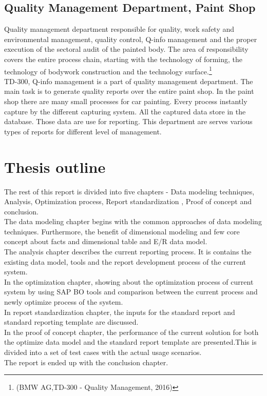 \subsection{Quality Management Department, Paint Shop}

Quality management department  responsible for quality, work safety and environmental management, quality control, Q-info management and the proper execution of the sectoral audit of the painted body. The area of responsibility covers the entire process chain, starting with the technology of forming, the technology of bodywork construction and the technology surface.\footnote{(BMW AG,TD-300 - Quality Management, 2016)}\\

TD-300, Q-info management is a part of quality management department. The main task is to generate quality reports over the entire paint shop. In the paint shop there are many small  processes for car painting. Every process instantly capture by the different capturing system. All the captured data store in the database. Those data are use for reporting. This department are serves various types of reports for different level of management.\newpage   
\section{Thesis outline}
The rest of this report is divided into five chapters - Data modeling techniques, Analysis, Optimization process, Report standardization , Proof of concept and conclusion.\\

The data modeling  chapter begins with the common approaches of data modeling techniques. Furthermore, the benefit of dimensional modeling  and few core concept about facts and dimensional table and E/R data model. \\

The analysis chapter describes the current reporting process. It is contains the existing data model, tools and the report development process of the current system.\\

In the optimization  chapter, showing about the optimization process of current system by using SAP BO tools and comparison between the current process and newly optimize process of the system.\\

In report standardization chapter, the inputs for the standard report and standard reporting template are discussed.\\

In the proof of concept chapter, the performance of the current solution for both the optimize data model and the standard report template are presented.This is divided into a set of test cases with the actual usage scenarios.\\

The report is ended up with the conclusion chapter. 